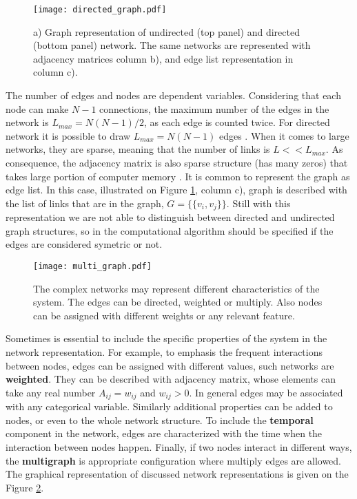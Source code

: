 \begin{figure}[h]
	\centering
	\texttt{[image: directed\_graph.pdf]} 
	\caption[Graph, matrix and edge list representations.]{a) Graph representation of undirected (top panel) and directed (bottom panel) network. The same networks are represented with adjacency matrices column b), and edge list representation in column c).}
	\label{fig:graph_dir}
\end{figure}

The number of edges and nodes are dependent variables. Considering that each node can make $N-1$ connections, the maximum number of the edges in the network is $L_{max}=N(N-1)/2$, as each edge is counted twice. For directed network it is possible to draw $L_{max}=N(N-1)$ edges \cite{caldarelli2007scalefree}. When it comes to large networks, they are sparse, meaning that the number of links is $L<<L_{max}$. As consequence, the adjacency matrix is also sparse structure (has many zeros) that takes large portion of computer memory \cite{barabasi2016network}. 
It is common to represent the graph as edge list. In this case, illustrated on Figure \ref{fig:graph_dir}, column c), graph is described with the list of links that are in the graph, $G = \{ \{v_i,v_j\}\}$. Still with this representation we are not able to distinguish between directed and undirected graph structures, so in the computational algorithm should be specified if the edges are considered symetric or not.  


\begin{figure}[h]
	\centering
	\texttt{[image: multi\_graph.pdf]} 
	\caption[Different network representations.]{The complex networks may represent different characteristics of the system. The edges can be directed, weighted or multiply. Also nodes can be assigned with different weights or any relevant feature.}
	\label{fig:multigraph}
\end{figure}

Sometimes is essential to include the specific properties of the system in the network representation. For example, to emphasis the frequent interactions between nodes, edges can be assigned with different values, such networks are \textbf{weighted}. They can be described with adjacency matrix, whose elements can take any real number $A_{ij}=w_{ij}$ and $w_{ij}>0$. In general edges may be associated with any categorical variable. Similarly additional properties can be added to nodes, or even to the whole network structure. To include the \textbf{temporal} component in the network, edges are characterized with the time when the interaction between nodes happen. Finally, if two nodes interact in different ways, the \textbf{multigraph} is appropriate configuration where multiply edges are allowed. The graphical representation of discussed network representations is given on the Figure \ref{fig:multigraph}.

